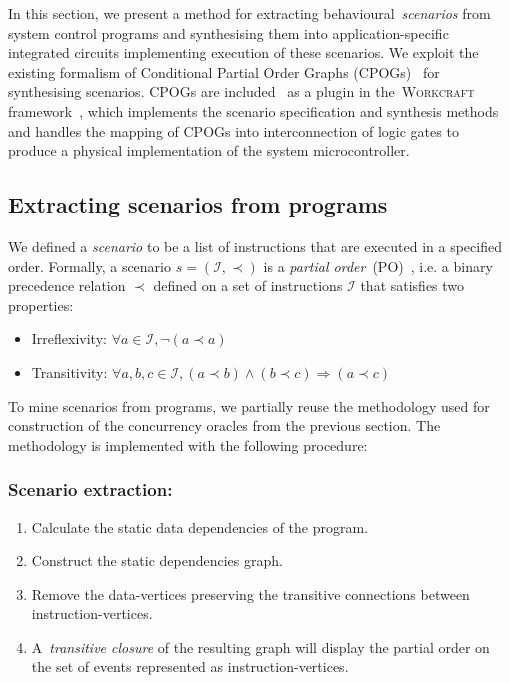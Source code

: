 In this section, we present a method for extracting behavioural~\emph{scenarios} from
system control programs and synthesising them into application-specific
integrated circuits implementing execution of these scenarios. We exploit the
existing formalism of Conditional Partial Order Graphs (CPOGs)~\cite{CPOG} for
synthesising scenarios. CPOGs are included~\cite{scenco-tool} as a plugin in
the~\textsc{Workcraft} framework~\cite{workcraft-tool}, which implements
the scenario specification and synthesis methods and handles the mapping of
CPOGs into interconnection of logic gates to produce a physical implementation
of the system microcontroller.

\subsection{Extracting scenarios from programs}

We defined a \textit{scenario} to be a list of
instructions that are executed in a specified order. Formally, a scenario
$s=(\mathcal{I},\prec)$ is a \textit{partial order}~(PO)~\cite{PO},
i.e. a binary precedence relation $\prec$ defined on a set of instructions
$\mathcal{I}$ that satisfies two properties:

\begin{itemize}
    \item Irreflexivity: $\forall a \in \mathcal{I}, \neg(a \prec a)$
    \vspace{+1mm}
    \item Transitivity: $\forall a, b, c \in \mathcal{I}, (a \prec b) \wedge (b
    \prec c) \Rightarrow (a \prec c)$
\end{itemize}

To mine scenarios from programs, we partially reuse the methodology
used for construction of the concurrency oracles from the previous section.
The methodology is implemented with the following procedure:

\subsubsection{Scenario extraction:}
\begin{enumerate}
    \item Calculate the static data dependencies of the program.
    \item Construct the static dependencies graph.
    \item Remove the data-vertices preserving the transitive connections between
        instruction-vertices.
    \item A~\emph{transitive closure} of the resulting graph will display the
        partial order on the set of events represented as instruction-vertices.
\end{enumerate}

